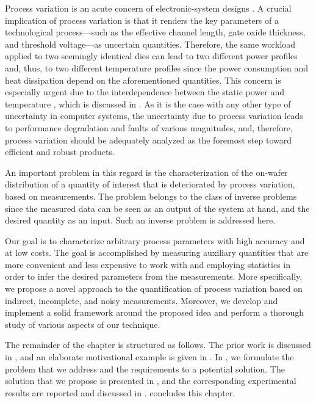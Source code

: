 Process variation is an acute concern of electronic-system designs
\cite{chandrakasan2000, srivastava2010}. A crucial implication of process
variation is that it renders the key parameters of a technological
process---such as the effective channel length, gate oxide thickness, and
threshold voltage---as uncertain quantities. Therefore, the same workload
applied to two seemingly identical dies can lead to two different power profiles
and, thus, to two different temperature profiles since the power consumption and
heat dissipation depend on the aforementioned quantities. This concern is
especially urgent due to the interdependence between the static power and
temperature \cite{liu2007, srivastava2010}, which is discussed in
. As it is the case with any other type of
uncertainty in computer systems, the uncertainty due to process variation leads
to performance degradation and faults of various magnitudes, and, therefore,
process variation should be adequately analyzed as the foremost step toward
efficient and robust products.

An important problem in this regard is the characterization of the on-wafer
distribution of a quantity of interest that is deteriorated by process
variation, based on measurements. The problem belongs to the class of inverse
problems since the measured data can be seen as an output of the system at hand,
and the desired quantity as an input. Such an inverse problem is addressed here.

Our goal is to characterize arbitrary process parameters with high accuracy and
at low costs. The goal is accomplished by measuring auxiliary quantities that
are more convenient and less expensive to work with and employing statistics in
order to infer the desired parameters from the measurements. More specifically,
we propose a novel approach to the quantification of process variation based on
indirect, incomplete, and noisy measurements. Moreover, we develop and implement
a solid framework around the proposed idea and perform a thorough study of
various aspects of our technique.

The remainder of the chapter is structured as follows. The prior work is
discussed in , and an elaborate motivational example is
given in . In , we formulate the
problem that we address and the requirements to a potential solution. The
solution that we propose is presented in , and the
corresponding experimental results are reported and discussed in
.  concludes this chapter.
